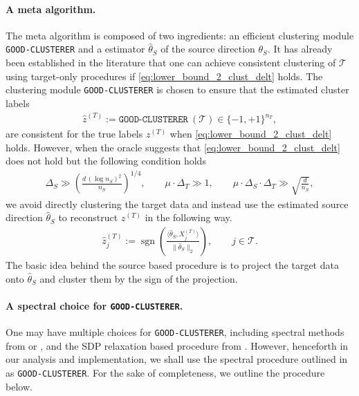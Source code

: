 \documentclass[10pt]{article}
\newcommand{\sgn}{\operatorname{sgn}}
\newcommand{\wh}{\widehat}
\newcommand{\calT}{\mathcal T}
\newcommand{\trg}{T}
\newcommand{\nT}{n_{\trg}}
\newcommand{\Xtar}{X^{(\trg)}}
\newcommand{\ztar}{z^{(\trg)}}
\newcommand{\hatztar}{\wh{z}^{(\trg)}}
\newcommand{\DeltaT}{\Delta_{\trg}}
\newcommand{\src}{S}
\newcommand{\thetaS}{\theta_{\src}}
\newcommand{\nS}{n_{\src}}
\newcommand{\DeltaS}{\Delta_{\src}}
\newcommand{\hatthetaS}{\wh{\theta}_S}
\begin{document}
\paragraph{A meta algorithm.}
The meta algorithm is composed of two ingredients: an efficient clustering module \texttt{GOOD-CLUSTERER} and a estimator $\wh \theta_S$ of the source direction $\thetaS$. It has already been established in the literature that one can achieve consistent clustering of $\calT$ using target-only procedures if \eqref{eq:lower_bound_2_clust_delt} holds. The clustering module \texttt{GOOD-CLUSTERER} is chosen to ensure that the estimated cluster labels 
\begin{align}
    \label{eq:oracle_target_estimate}
    \hatztar:=\texttt{GOOD-CLUSTERER}~(\calT) \in \{-1,+1\}^{\nT},
\end{align}
are consistent for the true labels $\ztar$ when \eqref{eq:lower_bound_2_clust_delt} holds.
However, when the oracle suggests that \eqref{eq:lower_bound_2_clust_delt} does not hold but the following condition holds
\begin{align}
    \label{eq:lower_bound_3_clust_delt}
    \DeltaS \gg \left(\frac{d\,(\log \nS)^2}{\nS}\right)^{1/4},
    \qquad
    \mu\cdot\DeltaT \gg 1,
    \qquad
    \mu\cdot\DeltaS\cdot\DeltaT \gg \sqrt{\frac{d}{\nS}},
\end{align}
we avoid directly clustering the target data and instead use the estimated source direction $\wh\theta_S$ to reconstruct $\ztar$ in the following way.
\begin{align}
    \label{eq:oracle_source_estimate}
    \hatztar_j := \sgn\!\left(
    \frac{\langle \hatthetaS, \Xtar_j \rangle}{\|\hatthetaS\|_2}
    \right),
    \qquad j \in \calT.
\end{align}
The basic idea behind the source based procedure is to project the target data onto $\wh \theta_S$ and cluster them by the sign of the projection. 

\paragraph{A spectral choice for \texttt{GOOD-CLUSTERER}.} One may have multiple choices for \texttt{GOOD-CLUSTERER}, including spectral methods from \cite{LofflerZhangZhou2021} or \cite{Ndaoud2022}, and the SDP relaxation based procedure from \cite{giraud2019partial}. However, henceforth in our analysis and implementation, we shall use the spectral procedure outlined in \cite{Ndaoud2022} as \texttt{GOOD-CLUSTERER}. For the sake of completeness, we outline the procedure below. 
\end{document}
